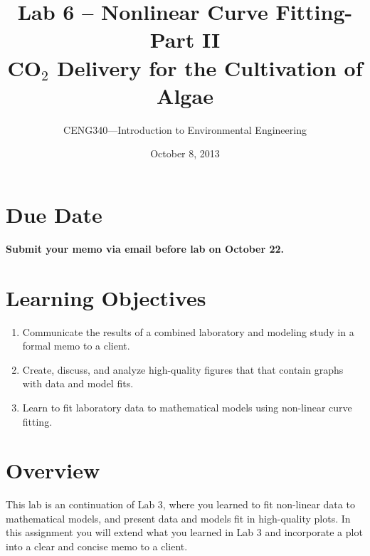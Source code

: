 \documentclass[12pt,letterpaper]{article}
\begin{document}
\setlength{\parindent}{0cm} 


\frenchspacing

\title {\textbf{Lab 6 -- Nonlinear Curve Fitting-Part II} \\ \vspace{2 mm} {\large \textbf{CO$_2$ Delivery for the Cultivation of Algae}}}

\author {CENG340---Introduction to Environmental Engineering}
\date {October 8, 2013}
\maketitle

\section *{Due Date}
\textbf{Submit your memo via email before lab on October 22.}
\section *{Learning Objectives}
\begin{enumerate}

\item Communicate the results of a combined laboratory and modeling study in a formal memo to a client.\ 
\item Create, discuss, and analyze high-quality figures that that contain graphs with data and model fits.\
\item Learn to fit laboratory data to mathematical models using non-linear curve fitting.\


\end{enumerate}

\section *{Overview}
This lab is an continuation of Lab 3, where you learned to fit non-linear data to mathematical models, and present data and models fit in high-quality plots.  In this assignment you will extend what you learned in Lab 3 and incorporate a plot into a clear and concise memo to a client. 
\end{document}
